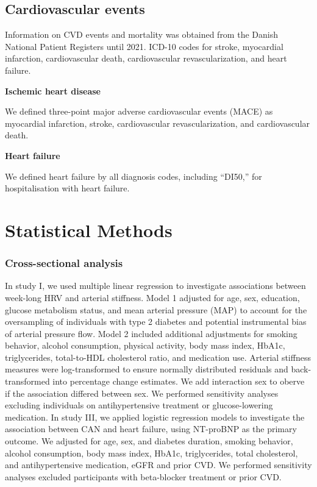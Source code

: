 \documentclass[
  a4paper,
  headsepline=true,
  open=any]{scrbook}
\begin{document}
\hypertarget{cardiovascular-events}{%
\subsection{Cardiovascular events}\label{cardiovascular-events}}

Information on CVD events and mortality was obtained from the Danish
National Patient Registers until 2021. ICD-10 codes for stroke,
myocardial infarction, cardiovascular death, cardiovascular
revascularization, and heart failure.

\textbf{Ischemic heart disease}

We defined three-point major adverse cardiovascular events (MACE) as
myocardial infarction, stroke, cardiovascular revascularization, and
cardiovascular death.

\textbf{Heart failure}

We defined heart failure by all diagnosis codes, including ``DI50,'' for
hospitalisation with heart failure.

\hypertarget{statistical-methods}{%
\section{Statistical Methods}\label{statistical-methods}}

\hypertarget{cross-sectional-analysis}{%
\subsubsection{Cross-sectional
analysis}\label{cross-sectional-analysis}}

In study I, we used multiple linear regression to investigate
associations between week-long HRV and arterial stiffness. Model 1
adjusted for age, sex, education, glucose metabolism status, and mean
arterial pressure (MAP) to account for the oversampling of individuals
with type 2 diabetes and potential instrumental bias of arterial
pressure flow. Model 2 included additional adjustments for smoking
behavior, alcohol consumption, physical activity, body mass index,
HbA1c, triglycerides, total-to-HDL cholesterol ratio, and medication
use. Arterial stiffness measures were log-transformed to ensure normally
distributed residuals and back-transformed into percentage change
estimates. We add interaction sex to oberve if the association differed
between sex. We performed sensitivity analyses excluding individuals on
antihypertensive treatment or glucose-lowering medication. In study III,
we applied logistic regression models to investigate the association
between CAN and heart failure, using NT-proBNP as the primary outcome.
We adjusted for age, sex, and diabetes duration, smoking behavior,
alcohol consumption, body mass index, HbA1c, triglycerides, total
cholesterol, and antihypertensive medication, eGFR and prior CVD. We
performed sensitivity analyses excluded participants with beta-blocker
treatment or prior CVD.
\end{document}
